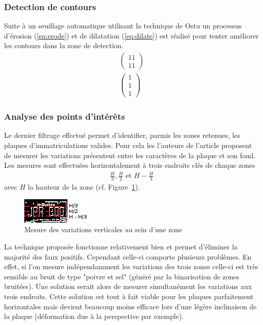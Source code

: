 \documentclass[a4paper,10pt,twocolumn]{article}
\begin{document}
\subsubsection{Detection de contours}
Suite à un seuillage automatique utilisant la technique de Ostu\cite{otsu79} un processus d'érosion (\ref{eq:erode}) et de dilatation (\ref{eq:dilate}) est réalisé pour tenter améliorer les contours dans la zone de detection.
\begin{gather}
  \label{eq:erode}
  \left( \begin{array}{c} 
    1 1\\
    1 1
  \end{array} \right)\\
  \label{eq:dilate}
  \left( \begin{array}{c} 
    1\\
    1\\
    1 
  \end{array} \right)
\end{gather}

\subsubsection{Analyse des points d'intérêts}
Le dernier filtrage effectué permet d'identifier, parmis les zones retenues, les plaques d'immatriculations valides. Pour cela les l'auteurs de l'article proposent de mesurer les variations présentent entre les caractères de la plaque et son fond. Les mesures sont effectuées horizontalement à trois endroits clés de chaque zones
\begin{align*}
  \frac{H}{3}, \frac{H}{2}\text{ et }H - \frac{H}{3}
\end{align*}
avec $H$ la hauteur de la zone (cf. Figure~\ref{plate_bin}).
\begin{figure}[H]
	\centering 
	  \includegraphics{img/plate_bin.png}
	\caption{Mesure des variations verticales au sein d'une zone\label{plate_bin}}
\end{figure}
La technique proposée fonctionne relativement bien et permet d'éliminer la majorité des faux positifs. Cependant celle-ci comporte plusieurs problèmes. En effet, si l'on mesure indépendamment les variations des trois zones celle-ci est très sensible au bruit de type "poivre et sel" (généré par la binarisation de zones bruitées). Une solution serait alors de mesurer simultanément les variations aux trois endroits. Cette solution est tout à fait viable pour les plaques parfaitement horizontales mais devient beaucoup moins efficace lors d'une légère inclinaison de la plaque (déformation due à la perspective par exemple). 
\end{document}
